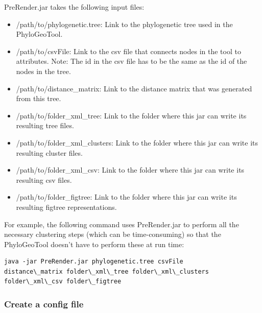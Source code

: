\documentclass[a4paper, 11pt]{article} %
\begin{document}
PreRender.jar takes the following input files: 
\begin{itemize}
\item /path/to/phylogenetic.tree: Link to the phylogenetic tree used in the PhyloGeoTool.
\item /path/to/csvFile: Link to the csv file that connects nodes in the tool to attributes. Note: The id in the csv file has to be the same as the id of the nodes in the tree.
\item /path/to/distance\_matrix: Link to the distance matrix that was generated from this tree. %
\item /path/to/folder\_xml\_tree: Link to the folder where this jar can write its resulting tree files.
\item /path/to/folder\_xml\_clusters: Link to the folder where this jar can write its resulting cluster files.
\item /path/to/folder\_xml\_csv: Link to the folder where this jar can write its resulting csv files.
\item /path/to/folder\_figtree: Link to the folder where this jar can write its resulting figtree representations.
\end{itemize}

For example, the following command uses PreRender.jar to perform all the necessary clustering steps (which can be time-consuming) so that the PhyloGeoTool doesn't have to perform these at run time: 
\begin{verbatim}
java -jar PreRender.jar phylogenetic.tree csvFile 
distance\_matrix folder\_xml\_tree folder\_xml\_clusters 
folder\_xml\_csv folder\_figtree
\end{verbatim}


\subsubsection{Create a config file}
\end{document}
